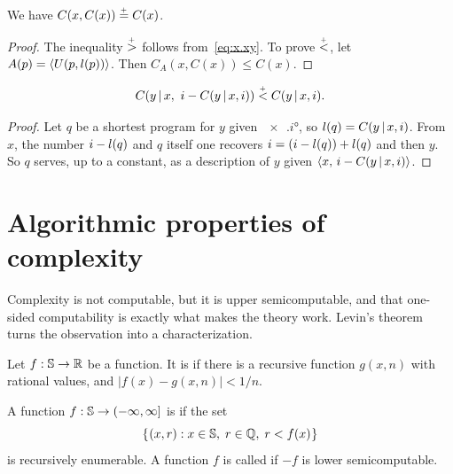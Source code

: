 \begin{theorem}
  \leanok
   \label{thm:xKx}
We have \( C(x,C(x)) \stackrel{{}_+}{=} C(x) \).
 \end{theorem}

\begin{proof}
  \leanok
 The inequality \( \stackrel{{}_+}{>} \) follows from~\eqref{eq:x.xy}. 
To prove \( \stackrel{{}_+}{<} \), let \( A(p) =  {\mathopen\langle  U(p,l(p))\mathclose\rangle}  \). 
Then \( C_A(x,C(x)) \le C(x) \).
 \end{proof}

\begin{theorem}
  \leanok
   \label{thm:strange}
 \[	
C(y\,\vert\, x,\ i-C(y\,\vert\, x,i)) \stackrel{{}_+}{<} C(y\,\vert\, x,i).
 \]
 \end{theorem}
\begin{proof}
  \leanok
  Let $q$ be a shortest program for $y$ given $\ang{x,i}$, so $l(q) = C(y \,\vert\, x,i)$. From $x$, the number $i - l(q)$ and $q$ itself one recovers $i = (i - l(q)) + l(q)$ and then $y$. So $q$ serves, up to a constant, as a description of $y$ given ${\mathopen\langle x,\, i - C(y \,\vert\, x,i)\mathclose\rangle}$.
\end{proof}




\section{Algorithmic properties of complexity}
Complexity is not computable, but it is upper semicomputable, and that one-sided
computability is exactly what makes the theory work. Levin's theorem turns the
observation into a characterization.


\begin{definition}[Computability]
  \label{def:computable-function}
  \leanok
Let \( f:\mathbb{S}\to\mathbb{R} \) be a function.
It is  if there is a recursive function \( g(x,n) \) with rational
values, and  \( |f(x)-g(x,n)| < 1/n \). 
\end{definition}

 \begin{definition}[Semicomputability]
  \leanok
  \label{def:semicomputability}
A function \( f : \mathbb{S} \to (-\infty,\infty] \) is 
if the set 
 \[
	\mathopen\{\mskip 1mu (x,r) : x \in \mathbb{S},\; r \in \mathbb{Q},\; r<f(x) \mskip 1mu\mathclose\}
 \] 
 is recursively enumerable. 
A function \( f \) is called  if \( -f \) is
lower semicomputable.
 \end{definition}


